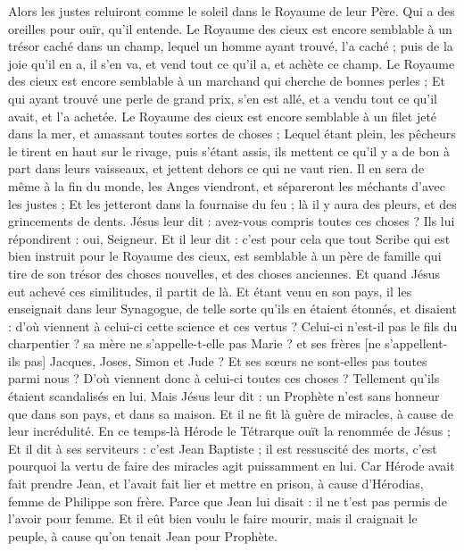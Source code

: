 \begin{multicols}{2}
Alors les justes reluiront comme le soleil dans le Royaume de leur Père. Qui a des oreilles pour ouïr, qu'il entende.
Le Royaume des cieux est encore semblable à un trésor caché dans un champ, lequel un homme ayant trouvé, l'a caché ; puis de la joie qu'il en a, il s'en va, et vend tout ce qu'il a, et achète ce champ.
Le Royaume des cieux est encore semblable à un marchand qui cherche de bonnes perles ;
Et qui ayant trouvé une perle de grand prix, s'en est allé, et a vendu tout ce qu'il avait, et l'a achetée.
Le Royaume des cieux est encore semblable à un filet jeté dans la mer, et amassant toutes sortes de choses ;
Lequel étant plein, les pêcheurs le tirent en haut sur le rivage, puis s'étant assis, ils mettent ce qu'il y a de bon à part dans leurs vaisseaux, et jettent dehors ce qui ne vaut rien.
Il en sera de même à la fin du monde, les Anges viendront, et sépareront les méchants d'avec les justes ;
Et les jetteront dans la fournaise du feu ; là il y aura des pleurs, et des grincements de dents.
Jésus leur dit : avez-vous compris toutes ces choses ? Ils lui répondirent : oui, Seigneur.
Et il leur dit : c'est pour cela que tout Scribe qui est bien instruit pour le Royaume des cieux, est semblable à un père de famille qui tire de son trésor des choses nouvelles, et des choses anciennes.
Et quand Jésus eut achevé ces similitudes, il partit de là.
Et étant venu en son pays, il les enseignait dans leur Synagogue, de telle sorte qu'ils en étaient étonnés, et disaient : d'où viennent à celui-ci cette science et ces vertus ?
Celui-ci n'est-il pas le fils du charpentier ? sa mère ne s'appelle-t-elle pas Marie ? et ses frères [ne s'appellent-ils pas] Jacques, Joses, Simon et Jude ?
Et ses sœurs ne sont-elles pas toutes parmi nous ? D'où viennent donc à celui-ci toutes ces choses ?
Tellement qu'ils étaient scandalisés en lui. Mais Jésus leur dit : un Prophète n'est sans honneur que dans son pays, et dans sa maison.
Et il ne fit là guère de miracles, à cause de leur incrédulité.
\VerseOne{}En ce temps-là Hérode le Tétrarque ouït la renommée de Jésus ;
Et il dit à ses serviteurs : c'est Jean Baptiste ; il est ressuscité des morts, c'est pourquoi la vertu de faire des miracles agit puissamment en lui.
Car Hérode avait fait prendre Jean, et l'avait fait lier et mettre en prison, à cause d'Hérodias, femme de Philippe son frère.
Parce que Jean lui disait : il ne t'est pas permis de l'avoir pour femme.
Et il eût bien voulu le faire mourir, mais il craignait le peuple, à cause qu'on tenait Jean pour Prophète.

\end{multicols}
